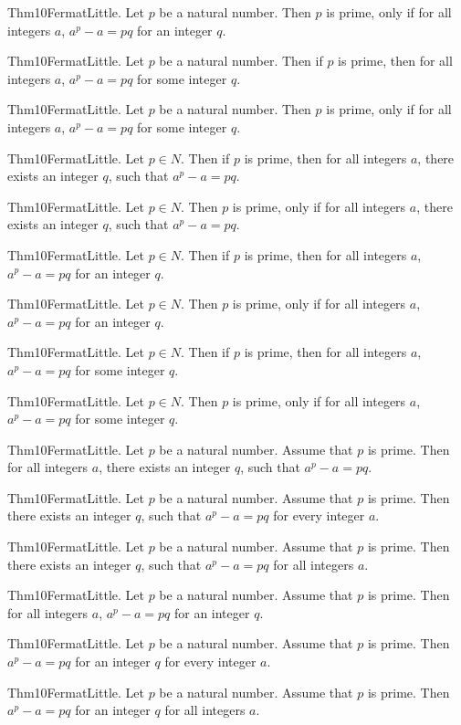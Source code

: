 \documentclass{article}
\begin{document}
Thm10FermatLittle. Let $p$ be a natural number. Then $p$ is prime, only if for all integers $a$, $a ^ {p}- a = p q$ for an integer $q$.

Thm10FermatLittle. Let $p$ be a natural number. Then if $p$ is prime, then for all integers $a$, $a ^ {p}- a = p q$ for some integer $q$.

Thm10FermatLittle. Let $p$ be a natural number. Then $p$ is prime, only if for all integers $a$, $a ^ {p}- a = p q$ for some integer $q$.

Thm10FermatLittle. Let $p \in N$. Then if $p$ is prime, then for all integers $a$, there exists an integer $q$, such that $a ^ {p}- a = p q$.

Thm10FermatLittle. Let $p \in N$. Then $p$ is prime, only if for all integers $a$, there exists an integer $q$, such that $a ^ {p}- a = p q$.

Thm10FermatLittle. Let $p \in N$. Then if $p$ is prime, then for all integers $a$, $a ^ {p}- a = p q$ for an integer $q$.

Thm10FermatLittle. Let $p \in N$. Then $p$ is prime, only if for all integers $a$, $a ^ {p}- a = p q$ for an integer $q$.

Thm10FermatLittle. Let $p \in N$. Then if $p$ is prime, then for all integers $a$, $a ^ {p}- a = p q$ for some integer $q$.

Thm10FermatLittle. Let $p \in N$. Then $p$ is prime, only if for all integers $a$, $a ^ {p}- a = p q$ for some integer $q$.

Thm10FermatLittle. Let $p$ be a natural number. Assume that $p$ is prime. Then for all integers $a$, there exists an integer $q$, such that $a ^ {p}- a = p q$.

Thm10FermatLittle. Let $p$ be a natural number. Assume that $p$ is prime. Then there exists an integer $q$, such that $a ^ {p}- a = p q$ for every integer $a$.

Thm10FermatLittle. Let $p$ be a natural number. Assume that $p$ is prime. Then there exists an integer $q$, such that $a ^ {p}- a = p q$ for all integers $a$.

Thm10FermatLittle. Let $p$ be a natural number. Assume that $p$ is prime. Then for all integers $a$, $a ^ {p}- a = p q$ for an integer $q$.

Thm10FermatLittle. Let $p$ be a natural number. Assume that $p$ is prime. Then $a ^ {p}- a = p q$ for an integer $q$ for every integer $a$.

Thm10FermatLittle. Let $p$ be a natural number. Assume that $p$ is prime. Then $a ^ {p}- a = p q$ for an integer $q$ for all integers $a$.
\end{document}
